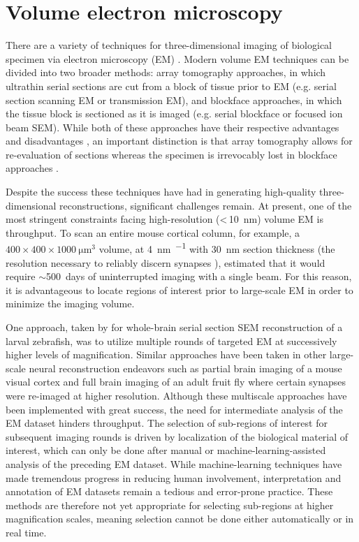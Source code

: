 \section{Volume electron microscopy}
\label{sec:1_vEM}

There are a variety of techniques for three-dimensional imaging of biological specimen via electron microscopy (EM) \cite{peddie2014exploring, peddie2022volume, kievits2022innovations}. Modern volume EM techniques can be divided into two broader methods: array tomography approaches, in which ultrathin serial sections are cut from a block of tissue prior to EM (e.g. serial section scanning EM or transmission EM), and blockface approaches, in which the tissue block is sectioned as it is imaged (e.g. serial blockface or focused ion beam SEM). While both of these approaches have their respective advantages and disadvantages \cite{briggman2012volume, peddie2014exploring}, an important distinction is that array tomography allows for re-evaluation of sections whereas the specimen is irrevocably lost in blockface approaches \cite{schifferer2021niwaki}.

Despite the success these techniques have had in generating high-quality three-dimensional reconstructions, significant challenges remain. At present, one of the most stringent constraints facing high-resolution (<\,\SI{10}{\nano\meter}) volume EM is throughput. To scan an entire mouse cortical column, for example, a $400 \times 400 \times \SI{1000}{\micro\meter^3}$ volume, at \SI{4}{\nano\meter\per\pixel} with \SI{30}{\nano\meter} section thickness (the resolution necessary to reliably discern synapses \cite{harris1989dendritic, meinertzhagen1991synaptic}), \textcite{briggman2012volume} estimated that it would require ${\sim}$\SI{500}{days} of uninterrupted imaging with a single beam. For this reason, it is advantageous to locate regions of interest prior to large-scale EM in order to minimize the imaging volume.

One approach, taken by \textcite{hildebrand2017whole} for whole-brain serial section SEM reconstruction of a larval zebrafish, was to utilize multiple rounds of targeted EM at successively higher levels of magnification. Similar approaches have been taken in other large-scale neural reconstruction endeavors such as partial brain imaging of a mouse visual cortex \cite{bock2011network} and full brain imaging of an adult fruit fly \cite{zheng2018complete} where certain synapses were re-imaged at higher resolution. Although these multiscale approaches have been implemented with great success, the need for intermediate analysis of the EM dataset hinders throughput. The selection of sub-regions of interest for subsequent imaging rounds is driven by localization of the biological material of interest, which can only be done after manual or machine-learning-assisted analysis of the preceding EM dataset. While machine-learning techniques have made tremendous progress in reducing human involvement, interpretation and annotation of EM datasets remain a tedious and error-prone practice. These methods are therefore not yet appropriate for selecting sub-regions at higher magnification scales, meaning selection cannot be done either automatically or in real time.


